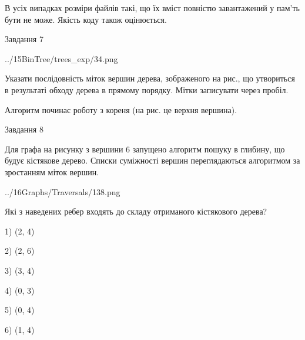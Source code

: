 \documentclass[12pt, ukrainian]{article}
\begin{document}
{В усіх випадках розміри файлів такі, що їх вміст повністю завантажений у пам'ть бути не може. Якість коду також оцінюється.



\vspace{10mm}\par

\newpage
\begin{minipage}[t]{9.7cm}
               
{\begin{center}Завдання {7}\end{center}}
\vspace{-4mm}

\begin{center}
	{../15BinTree/trees_exp/34.png}
\end{center}
Указати послідовність міток вершин дерева, зображеного на рис., що утвориться в результаті обходу дерева в прямому порядку. Мітки записувати через пробіл.\par Алгоритм починає роботу з кореня (на рис. це верхня вершина).\par

\end{minipage}
\vline \hspace{8mm}
\begin{minipage}[t]{8.0cm}
               
{\begin{center}Завдання {8}\end{center}}
\vspace{-4mm}
Для графа на рисунку з вершини 6 запущено алгоритм пошуку в глибину, що будує кістякове дерево. Списки суміжності вершин переглядаються алгоритмом за зростанням міток вершин.\par
\begin{center}
	{../16Graphs/Traversals/138.png}
\end{center}
\par Які з наведених ребер входять до складу отриманого кістякового дерева?\par
1) (2, 4)\par
2) (2, 6)\par
3) (3, 4)\par
4) (0, 3)\par
5) (0, 4)\par
6) (1, 4)\par
{\vskip 15pt} \par


\end{minipage}}
\end{document}
